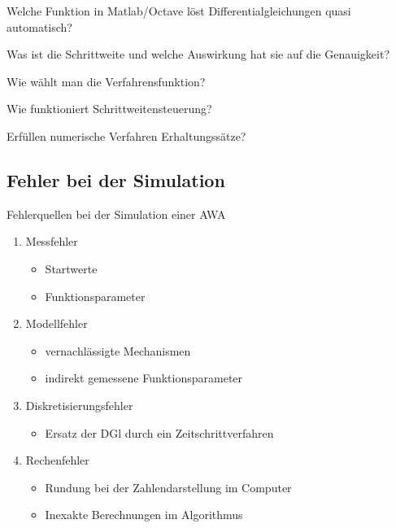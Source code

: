 \begin{Abschluss}
\item Welche Funktion in Matlab/Octave \glqq{}löst\grqq{} Differentialgleichungen quasi automatisch?
\item Was ist die Schrittweite und welche Auswirkung hat sie auf
  die Genauigkeit?
\item Wie wählt man die Verfahrensfunktion?
\item Wie funktioniert Schrittweitensteuerung?
\item Erfüllen numerische Verfahren Erhaltungssätze?
\end{Abschluss}

\subsection{Fehler bei der Simulation}

\begin{frame}{Fehlerquellen bei der Simulation einer AWA}
  \begin{enumerate}
  \item Messfehler
    \begin{itemize}
    \item Startwerte
    \item Funktionsparameter
    \end{itemize}
  \item Modellfehler
    \begin{itemize}
    \item vernachlässigte Mechanismen
    \item indirekt gemessene Funktionsparameter
    \end{itemize}
  \item Diskretisierungsfehler
    \begin{itemize}
    \item Ersatz der DGl durch ein Zeitschrittverfahren
    \end{itemize}
  \item Rechenfehler
    \begin{itemize}
    \item Rundung bei der Zahlendarstellung im Computer
    \item Inexakte Berechnungen im Algorithmus
    \end{itemize}
  \end{enumerate}
\end{frame}

